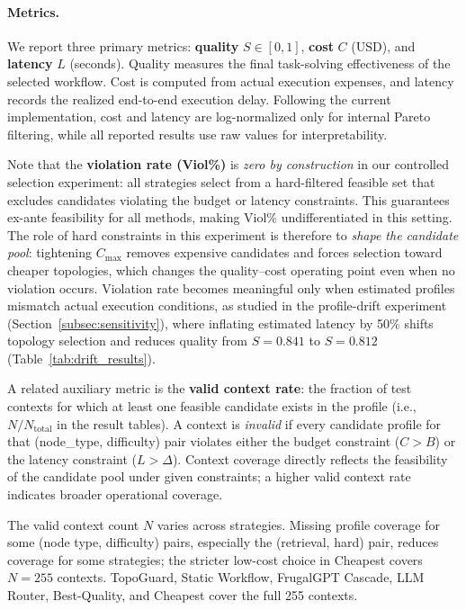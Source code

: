 \documentclass[manuscript,review,anonymous]{acmart}
\begin{document}
\paragraph{Metrics.}
We report three primary metrics: \textbf{quality} $S\in[0,1]$, \textbf{cost} $C$ (USD), and \textbf{latency} $L$ (seconds).
Quality measures the final task-solving effectiveness of the selected workflow.
Cost is computed from actual execution expenses, and latency records the realized end-to-end execution delay.
Following the current implementation, cost and latency are log-normalized only for internal Pareto filtering, while all reported results use raw values for interpretability.

Note that the \textbf{violation rate (Viol\%)} is \emph{zero by construction} in our controlled selection experiment: all strategies select from a hard-filtered feasible set that excludes candidates violating the budget or latency constraints. This guarantees ex-ante feasibility for all methods, making Viol\% undifferentiated in this setting. The role of hard constraints in this experiment is therefore to \emph{shape the candidate pool}: tightening $C_{\max}$ removes expensive candidates and forces selection toward cheaper topologies, which changes the quality--cost operating point even when no violation occurs. Violation rate becomes meaningful only when estimated profiles mismatch actual execution conditions, as studied in the profile-drift experiment (Section~\ref{subsec:sensitivity}), where inflating estimated latency by 50\% shifts topology selection and reduces quality from $S=0.841$ to $S=0.812$ (Table~\ref{tab:drift_results}).

A related auxiliary metric is the \textbf{valid context rate}: the fraction of test contexts for which at least one feasible candidate exists in the profile (i.e., $N / N_{\text{total}}$ in the result tables). A context is \emph{invalid} if every candidate profile for that (node\_type, difficulty) pair violates either the budget constraint ($C > B$) or the latency constraint ($L > \Delta$). Context coverage directly reflects the feasibility of the candidate pool under given constraints; a higher valid context rate indicates broader operational coverage.

The valid context count $N$ varies across strategies. Missing profile coverage for some (node type, difficulty) pairs, especially the (retrieval, hard) pair, reduces coverage for some strategies; the stricter low-cost choice in Cheapest covers $N=255$ contexts. TopoGuard, Static Workflow, FrugalGPT Cascade, LLM Router, Best-Quality, and Cheapest cover the full 255 contexts.
\end{document}
